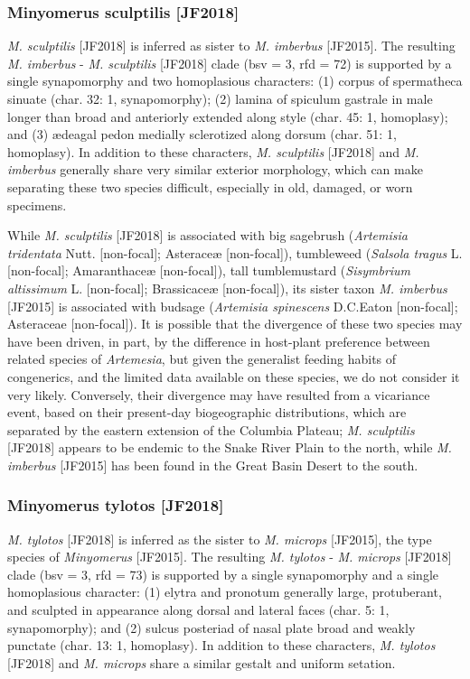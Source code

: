 \documentclass[fleqn,10pt,lineno]{wlpeerj} %
\begin{document}
		\subsubsection*{Minyomerus sculptilis \textnormal{\bfseries[JF2018]}}
			\textit{M. sculptilis} [JF2018] is inferred as sister to \textit{M. imberbus} [JF2015].
			The resulting \textit{M. imberbus} - \textit{M. sculptilis} [JF2018] clade (bsv = 3, rfd = 72) is supported by a single synapomorphy and two homoplasious characters: (1) corpus of spermatheca sinuate (char. 32: 1, synapomorphy); (2) lamina of spiculum gastrale in male longer than broad and anteriorly extended along style (char. 45: 1, homoplasy); and (3) {\ae}deagal pedon medially sclerotized along dorsum (char. 51: 1, homoplasy).
			In addition to these characters, \textit{M. sculptilis} [JF2018] and \textit{M. imberbus} generally share very similar exterior morphology, which can make separating these two species difficult, especially in old, damaged, or worn specimens.
			
			While \textit{M. sculptilis} [JF2018] is associated with big sagebrush (\textit{Artemisia tridentata} Nutt. [non-focal]; Asterace{\ae} [non-focal]), tumbleweed (\textit{Salsola tragus} L. [non-focal]; Amaranthace{\ae} [non-focal]), tall tumblemustard (\textit{Sisymbrium altissimum} L. [non-focal]; Brassicace{\ae} [non-focal]), its sister taxon \textit{M. imberbus} [JF2015] is associated with budsage (\textit{Artemisia spinescens} D.C.Eaton [non-focal]; Asteraceae [non-focal]).
			It is possible that the divergence of these two species may have been driven, in part, by the difference in host-plant preference between related species of \textit{Artemesia}, but given the generalist feeding habits of congenerics, and the limited data available on these species, we do not consider it very likely.
			Conversely, their divergence may have resulted from a vicariance event, based on their present-day biogeographic distributions, which are separated by the eastern extension of the Columbia Plateau; \textit{M. sculptilis} [JF2018] appears to be endemic to the Snake River Plain to the north, while \textit{M. imberbus} [JF2015] has been found in the Great Basin Desert to the south.
			
		\subsubsection*{Minyomerus tylotos \textnormal{\bfseries[JF2018]}}	
			\textit{M. tylotos} [JF2018] is inferred as the sister to \textit{M. microps} [JF2015], the type species of \textit{Minyomerus} [JF2015].
			The resulting \textit{M. tylotos} - \textit{M. microps} [JF2018] clade (bsv = 3, rfd = 73) is supported by a single synapomorphy and a single homoplasious character: (1) elytra and pronotum generally large, protuberant, and sculpted in appearance along dorsal and lateral faces (char. 5: 1, synapomorphy); and (2) sulcus posteriad of nasal plate broad and weakly punctate (char. 13: 1, homoplasy).
			In addition to these characters, \textit{M. tylotos} [JF2018] and \textit{M. microps} share a similar gestalt and uniform setation.
			
\end{document}
